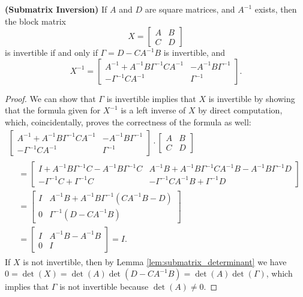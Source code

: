\documentclass{article}
\begin{document}
	\begin{lem} \textnormal{\bf(Submatrix Inversion)}
		\label{lem:submatrix_inversion}
		If $A$ and $D$ are square matrices, and $A^{-1}$ exists, then the block matrix
		\begin{equation}
			X = \left[\begin{matrix}
				A & B \\
				C & D
			\end{matrix}\right]
		\end{equation}
		is invertible if and only if $\Gamma = D - CA^{-1}B$ is invertible, and
		\begin{equation}
			X^{-1} = \left[\begin{matrix}
				A^{-1} + A^{-1}B\Gamma^{-1}CA^{-1} & -A^{-1}B\Gamma^{-1} \\
				-\Gamma^{-1}CA^{-1}& \Gamma^{-1}
			\end{matrix}\right].
		\end{equation}
	\end{lem}
	
	\begin{proof}
		We can show that $\Gamma$ is invertible implies that $X$ is invertible by showing that the formula given for $X^{-1}$ is a left inverse of $X$ by direct computation, which, coincidentally, proves the correctness of the formula as well:
		\begin{multline}
			\left[\begin{matrix}
				A^{-1} + A^{-1}B\Gamma^{-1}CA^{-1} & -A^{-1}B\Gamma^{-1} \\
				-\Gamma^{-1}CA^{-1}& \Gamma^{-1}
			\end{matrix}\right]\cdot\left[\begin{matrix}
				A & B \\
				C & D
			\end{matrix}\right]\\
			\begin{aligned}
				&= \left[\begin{matrix}
					I + A^{-1}B\Gamma^{-1}C - A^{-1}B\Gamma^{-1}C & A^{-1}B + A^{-1}B\Gamma^{-1}CA^{-1}B -A^{-1}B\Gamma^{-1}D  \\
					-\Gamma^{-1}C+\Gamma^{-1}C & -\Gamma^{-1}CA^{-1}B + \Gamma^{-1}D
				\end{matrix}\right] \\
				&= \left[\begin{matrix}
					I &  A^{-1}B + A^{-1}B\Gamma^{-1}\left(CA^{-1}B-D\right)\\
					0 & \Gamma^{-1}\left(D - CA^{-1}B\right)
				\end{matrix}\right]\\
				&=\left[\begin{matrix}
					I & A^{-1}B - A^{-1}B \\
					0 & I
				\end{matrix}\right] = I.
			\end{aligned}
		\end{multline}
		If $X$ is not invertible, then by Lemma \ref{lem:submatrix_determinant} we have $0 =\det(X) = \det(A)\det(D-CA^{-1}B) = \det(A)\det(\Gamma)$, which implies that $\Gamma$ is not invertible because $\det(A) \ne 0$.
	\end{proof}
	
\end{document}
